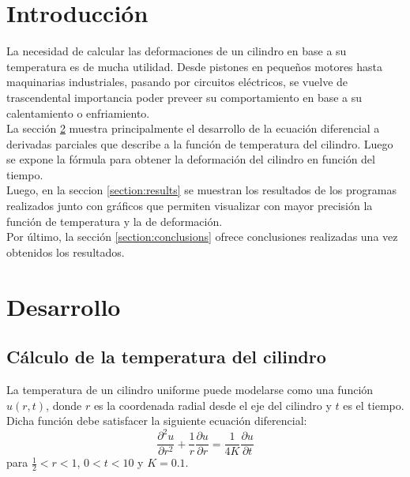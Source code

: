 \documentclass[journal, monochrome]{IEEEtran}
\begin{document}
\section{Introducción}

La necesidad de calcular las deformaciones de un cilindro en base a su temperatura es de mucha utilidad. Desde pistones
en pequeños motores hasta maquinarias industriales, pasando por circuitos eléctricos, se vuelve de trascendental importancia poder preveer su comportamiento en base a su calentamiento o enfriamiento. \\

La sección \ref{section:development} muestra principalmente el desarrollo de la ecuación diferencial a derivadas parciales que describe a la función de temperatura del cilindro. Luego se expone la fórmula para obtener la deformación del cilindro en función del tiempo. \\

Luego, en la seccion \ref{section:results} se muestran los resultados de los programas realizados junto con gráficos que permiten visualizar con mayor precisión la función de temperatura y la de deformación. \\

Por último, la sección \ref{section:conclusions} ofrece conclusiones realizadas una vez obtenidos los resultados.


\vspace{1cm}
\section{Desarrollo}
\label{section:development}
\vspace{0.5cm}
\subsection{Cálculo de la temperatura del cilindro}

La temperatura de un cilindro uniforme puede modelarse como una función $u(r,t)$, donde $r$ es la coordenada radial desde el eje del cilindro y $t$ es el tiempo. Dicha función debe satisfacer la siguiente ecuación diferencial:
\begin{equation}
\frac{\partial^{2} u}{\partial r^{2}} + \frac{1}{r} \frac{\partial u}{\partial r} = \frac{1}{4K} \frac{\partial u}{\partial t}
\label{equation:diff}
\end{equation}
para $\frac{1}{2} < r < 1$, $0< t < 10$ y $K = 0.1$. \\
\end{document}

